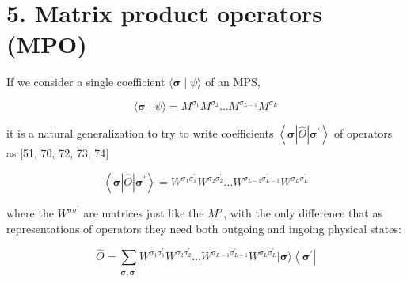 \documentclass[12pt]{article}
\begin{document}
\section*{5. Matrix product operators (MPO)}
If we consider a single coefficient $\langle\boldsymbol{\sigma} \mid \psi\rangle$ of an MPS,

$$
\langle\boldsymbol{\sigma} \mid \psi\rangle=M^{\sigma_{1}} M^{\sigma_{2}} \ldots M^{\sigma_{L-1}} M^{\sigma_{L}}
$$

it is a natural generalization to try to write coefficients $\left\langle\boldsymbol{\sigma}|\hat{O}| \boldsymbol{\sigma}^{\prime}\right\rangle$ of operators as [51, 70, 72, 73, 74]


\begin{equation*}
\left\langle\boldsymbol{\sigma}|\hat{O}| \boldsymbol{\sigma}^{\prime}\right\rangle=W^{\sigma_{1} \sigma_{1}^{\prime}} W^{\sigma_{2} \sigma_{2}^{\prime}} \ldots W^{\sigma_{L-1} \sigma_{L-1}^{\prime}} W^{\sigma_{L} \sigma_{L}^{\prime}} \tag{176}
\end{equation*}


where the $W^{\sigma \sigma^{\prime}}$ are matrices just like the $M^{\sigma}$, with the only difference that as representations of operators they need both outgoing and ingoing physical states:


\begin{equation*}
\hat{O}=\sum_{\boldsymbol{\sigma}, \boldsymbol{\sigma}^{\prime}} W^{\sigma_{1} \sigma_{1}^{\prime}} W^{\sigma_{2} \sigma_{2}^{\prime}} \ldots W^{\sigma_{L-1} \sigma_{L-1}^{\prime}} W^{\sigma_{L} \sigma_{L}^{\prime}}|\boldsymbol{\sigma}\rangle\left\langle\boldsymbol{\sigma}^{\prime}\right| \tag{177}
\end{equation*}
\end{document}
